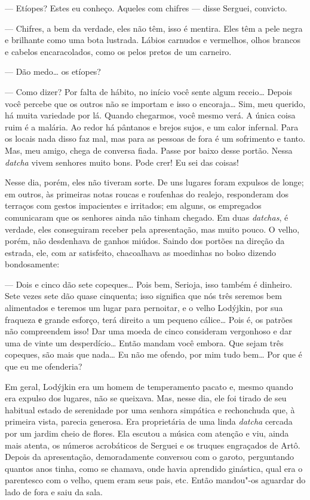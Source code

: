 --- Etíopes? Estes eu conheço. Aqueles com chifres --- disse Serguei,
convicto.

--- Chifres, a bem da verdade, eles não têm, isso é mentira. Eles têm a
pele negra e brilhante como uma bota lustrada. Lábios carnudos e
vermelhos, olhos brancos e cabelos encaracolados, como os pelos pretos
de um carneiro.

--- Dão medo\ldots{} os etíopes?

--- Como dizer? Por falta de hábito, no início você sente algum
receio\ldots{} Depois você percebe que os outros não se importam e isso o
encoraja\ldots{} Sim, meu querido, há muita variedade por lá. Quando
chegarmos, você mesmo verá. A única coisa ruim é a malária. Ao redor há
pântanos e brejos sujos, e um calor infernal. Para os locais nada disso faz mal, mas para as pessoas de fora é um sofrimento e tanto. Mas,
meu amigo, chega de conversa fiada. Passe por baixo desse portão. Nessa
\emph{datcha} vivem senhores muito bons. Pode crer! Eu sei das coisas!

Nesse dia, porém, eles não tiveram sorte. De uns lugares foram expulsos
de longe; em outros, às primeiras notas roucas e roufenhas do realejo,
responderam dos terraços com gestos impacientes e irritados; em alguns,
os empregados comunicaram que os senhores ainda não tinham chegado. Em
duas \emph{datchas}, é verdade, eles conseguiram receber pela
apresentação, mas muito pouco. O velho, porém, não desdenhava de ganhos
miúdos. Saindo dos portões na direção da estrada, ele, com ar
satisfeito, chacoalhava as moedinhas no bolso dizendo bondosamente:

--- Dois e cinco dão sete copeques\ldots{} Pois bem, Serioja, isso também é
dinheiro. Sete vezes sete dão quase cinquenta; isso significa que nós
três seremos bem alimentados e teremos um lugar para pernoitar, e o
velho Lodýjkin, por sua fraqueza е grande esforço, terá direito a um
pequeno cálice\ldots{} Pois é, os patrões não compreendem isso! Dar uma moeda
de cinco consideram vergonhoso e dar uma de vinte um desperdício\ldots{}
Então mandam você embora. Que sejam três copeques, são mais que nada\ldots{}
Eu não me ofendo, por mim tudo bem\ldots{} Por que é que eu me ofenderia?

Em geral, Lodýjkin era um homem de temperamento pacato e, mesmo quando
era expulso dos lugares, não se queixava. Mas, nesse dia, ele foi tirado
de seu habitual estado de serenidade por uma senhora simpática e
rechonchuda que, à primeira vista, parecia generosa. Era proprietária de
uma linda \emph{datcha} cercada por um jardim cheio de flores. Ela
escutou a música com atenção e viu, ainda mais atenta, os números
acrobáticos de Serguei e os truques engraçados de Artô. Depois da
apresentação, demoradamente conversou com o garoto, perguntando quantos
anos tinha, como se chamava, onde havia aprendido ginástica, qual era o
parentesco com o velho, quem eram seus pais, etc. Então mandou"-os
aguardar do lado de fora e saiu da sala.

